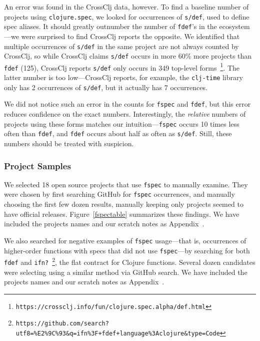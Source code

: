 An error was found in the CrossClj data, however.
To find a baseline number of projects using \texttt{clojure.spec}, we looked for occurrences of
\texttt{s/def}, used to define spec
aliases. It should greatly outnumber the number of \texttt{fdef}'s in the ecosystem---we were
surprised to find CrossClj reports the opposite.
We identified that multiple occurrences of \texttt{s/def} in the same project are not always counted by CrossClj,
so while CrossClj claims \texttt{s/def} occurs in more 60\% more projects than \texttt{fdef} (125), 
CrossClj reports \texttt{s/def} only occurs in 349 top-level 
forms~\footnote{\texttt{https://crossclj.info/fun/clojure.spec.alpha/def.html}}.
The latter number is too low---CrossClj reports, for example, the \texttt{clj-time}
library only has 2 occurrences of \texttt{s/def}, but it actually has 7 occurrences.

We did not notice such an error in the counts for \texttt{fspec} and \texttt{fdef}, but
this error reduces confidence on the exact numbers. Interestingly, the \emph{relative}
numbers of projects using these forms matches our intuition---\texttt{fspec} occurs
10 times less often than \texttt{fdef}, and \texttt{fdef} occurs about half as often as \texttt{s/def}.
Still, these numbers should be treated with suspicion.

\subsubsection{Project Samples}

We selected 18 open source projects that use \texttt{fspec} to manually examine.
They were chosen by first searching GitHub for \texttt{fspec} occurrences, and
manually choosing the first few dozen results, manually keeping only projects
seemed to have official releases.
Figure~\ref{fspectable} summarizes these findings. We have included the projects
names and our scratch notes as Appendix~\label{appendix1}.

We also searched for negative examples of \texttt{fspec} usage---that is, occurrences
of higher-order functions with specs that did not use \texttt{fspec}---by searching for
both \texttt{fdef} and 
\texttt{ifn?}~\footnote{\texttt{https://github.com/search?utf8=\%E2\%9C\%93\&q=ifn\%3F+fdef+language\%3Aclojure\&type=Code}}, 
the flat contract for Clojure functions.
Several dozen candidates were selecting using a similar method via GitHub search.
We have included the projects
names and our scratch notes as Appendix~\label{appendix2}.

